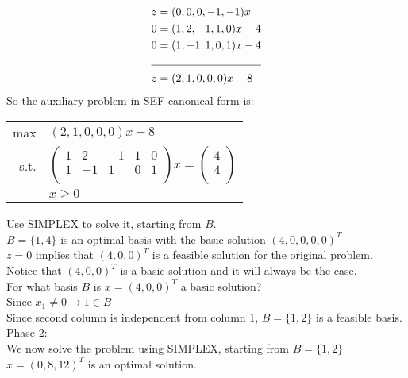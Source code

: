 \documentclass[letterpaper, 12pt]{article}
\begin{document}
    \begin{align*}
        z &= (0,0,0,-1,-1)x\\
        0 &= (1,2,-1,1,0)x - 4\\
        0 &= (1,-1,1,0,1)x - 4\\
        \cline{1-2}
        z &= (2,1,0,0,0)x - 8\\
    \end{align*}
    So the auxiliary problem in SEF canonical form is:\\
    \begin{center}
        \begin{tabular}{rl}
            max & $(2,1,0,0,0)x - 8$\\
            s.t. & $\begin{pmatrix}
                1 & 2 & -1 & 1 & 0\\
                1 & -1 & 1 & 0 & 1\\
            \end{pmatrix}x = \begin{pmatrix}
                4\\4\\
            \end{pmatrix}$\\
            & $x \geq 0$\\
        \end{tabular}
    \end{center}
    Use SIMPLEX to solve it, starting from $B$.\\
    $B = \{1,4\}$ is an optimal basis with the basic solution $(4, 0, 0, 0, 0)^T$\\
    $z = 0$ implies that $(4, 0, 0)^T$ is a feasible solution for the original problem.\\
    Notice that $(4, 0, 0)^T$ is a basic solution and it will always be the case.\\
    \bigskip
    For what basis $B$ is $x = (4,0,0)^T$ a basic solution?\\
    Since $x_1 \neq 0 \rightarrow 1 \in B$\\
    Since second column is independent from column 1, $B = \{1, 2\}$ is a feasible basis.\\
    \bigskip
    Phase 2:\\
    We now solve the problem using SIMPLEX, starting from $B = \{1, 2\}$\\
    $x = (0,8,12)^T$ is an optimal solution.\\
    \bigskip
\end{document}
